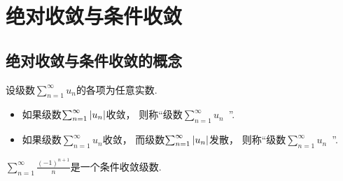 \section{绝对收敛与条件收敛}
\subsection{绝对收敛与条件收敛的概念}
\begin{definition}
设级数\(\sum_{n=1}^\infty u_n\)的各项为任意实数.
\begin{itemize}
	\item 如果级数\(\sum_{n=1}^\infty \abs{u_n}\)收敛，
	则称“级数\(\sum_{n=1}^\infty u_n\)~”.
	\item 如果级数\(\sum_{n=1}^\infty u_n\)收敛，
	而级数\(\sum_{n=1}^\infty \abs{u_n}\)发散，
	则称“级数\(\sum_{n=1}^\infty u_n\)~”.
\end{itemize}
\end{definition}

\begin{example}
\(\sum_{n=1}^\infty \frac{(-1)^{n+1}}n\)是一个条件收敛级数.
\end{example}

